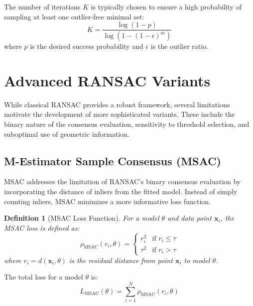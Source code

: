 \documentclass[12pt]{article}
\renewcommand{\vec}[1]{\mathbf{#1}}
\newtheorem{definition}[theorem]{Definition}
\begin{document}
The number of iterations $K$ is typically chosen to ensure a high probability of sampling at least one outlier-free minimal set:
\begin{equation}
    K = \frac{\log(1 - p)}{\log(1 - (1-\epsilon)^m)}
    \label{eq:ransac_iterations}
\end{equation}
where $p$ is the desired success probability and $\epsilon$ is the outlier ratio.

\newpage

\section{Advanced RANSAC Variants}
\label{sec:advanced_ransac}

While classical RANSAC provides a robust framework, several limitations motivate the development of more sophisticated variants. These include the binary nature of the consensus evaluation, sensitivity to threshold selection, and suboptimal use of geometric information.

\subsection{M-Estimator Sample Consensus (MSAC)}
\label{subsec:msac}

MSAC addresses the limitation of RANSAC's binary consensus evaluation by incorporating the distance of inliers from the fitted model. Instead of simply counting inliers, MSAC minimizes a more informative loss function.

\begin{definition}[MSAC Loss Function]
    \label{def:msac_loss}
    For a model $\theta$ and data point $\vec{x}_i$, the MSAC loss is defined as:
    \begin{equation}
        \rho_{\text{MSAC}}(r_i, \theta) = \begin{cases}
            r_i^2  & \text{if } r_i \leq \tau \\
            \tau^2 & \text{if } r_i > \tau
        \end{cases}
        \label{eq:msac_loss}
    \end{equation}
    where $r_i = d(\vec{x}_i, \theta)$ is the residual distance from point $\vec{x}_i$ to model $\theta$.
\end{definition}

The total loss for a model $\theta$ is:
\begin{equation}
    L_{\text{MSAC}}(\theta) = \sum_{i=1}^N \rho_{\text{MSAC}}(r_i, \theta)
    \label{eq:msac_total_loss}
\end{equation}
\end{document}
